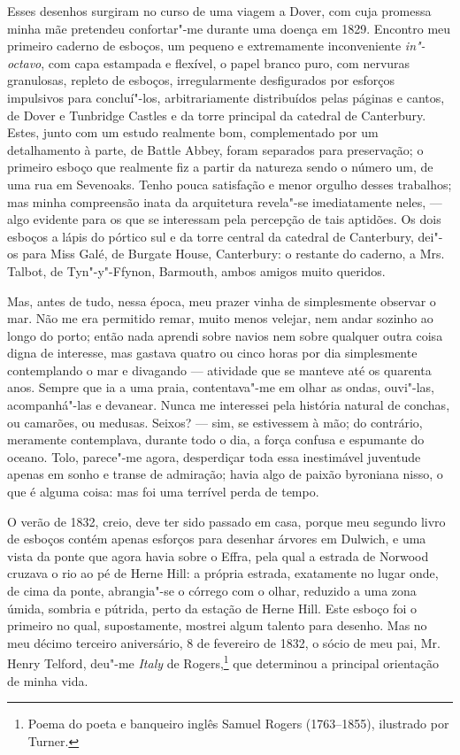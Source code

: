 Esses desenhos surgiram no curso de uma viagem a Dover, com cuja
promessa minha mãe pretendeu confortar"-me durante uma doença em 1829.
Encontro meu primeiro caderno de esboços, um pequeno e extremamente
inconveniente \textit{in"-octavo}, com capa estampada e flexível, o papel
branco puro, com nervuras granulosas, repleto de esboços, irregularmente
desfigurados por esforços impulsivos para concluí"-los, arbitrariamente
distribuídos pelas páginas e cantos, de Dover e Tunbridge Castles e da
torre principal da catedral de Canterbury. Estes, junto com um estudo
realmente bom, complementado por um detalhamento à parte, de Battle
Abbey, foram separados para preservação; o primeiro esboço que realmente
fiz a partir da natureza sendo o número um, de uma rua em Sevenoaks. Tenho
pouca satisfação e menor orgulho desses trabalhos; mas minha compreensão
inata da arquitetura revela"-se imediatamente neles, --- algo evidente
para os que se interessam pela percepção de tais aptidões. Os dois
esboços a lápis do pórtico sul e da torre central da catedral de
Canterbury, dei"-os para Miss Galé, de Burgate House, Canterbury: o
restante do caderno, a Mrs.\,Talbot, de Tyn"-y"-Ffynon, Barmouth, ambos
amigos muito queridos.

Mas, antes de tudo, nessa época, meu prazer vinha de simplesmente
observar o mar. Não me era permitido remar, muito menos velejar, nem
andar sozinho ao longo do porto; então nada aprendi sobre navios nem
sobre qualquer outra coisa digna de interesse, mas gastava quatro ou
cinco horas por dia simplesmente contemplando o mar e divagando ---
atividade que se manteve até os quarenta anos. Sempre que ia a uma
praia, contentava"-me em olhar as ondas, ouvi"-las, acompanhá"-las e
devanear. Nunca me interessei pela história natural de conchas, ou
camarões, ou medusas. Seixos? --- sim, se estivessem à mão; do contrário,
meramente contemplava, durante todo o dia, a força confusa e espumante
do oceano. Tolo, parece"-me agora, desperdiçar toda essa inestimável
juventude apenas em sonho e transe de admiração; havia algo de paixão
byroniana nisso, o que é alguma coisa: mas foi uma terrível perda de
tempo.

O verão de 1832, creio, deve ter sido passado em casa, porque meu
segundo livro de esboços contém apenas esforços para desenhar árvores em
Dulwich, e uma vista da ponte que agora havia sobre o Effra, pela
qual a estrada de Norwood cruzava o rio ao pé de Herne Hill: a própria
estrada, exatamente no lugar onde, de cima da ponte, abrangia"-se o
córrego com o olhar, reduzido a uma zona úmida, sombria e pútrida, perto
da estação de Herne Hill. Este esboço foi o primeiro no qual,
supostamente, mostrei algum talento para desenho. Mas no meu décimo terceiro aniversário, 8 de fevereiro de 1832, o sócio de meu pai, Mr.\,Henry Telford, deu"-me \textit{Italy} de Rogers,\footnote{Poema do poeta e
  banqueiro inglês Samuel Rogers (1763--1855), ilustrado por Turner.} que determinou a principal orientação de minha vida.

